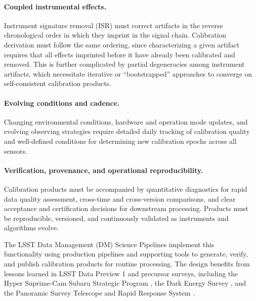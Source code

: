 \paragraph{Coupled instrumental effects.}
Instrument signature removal (ISR) must correct artifacts in the reverse chronological order in which they imprint in the signal chain.
Calibration derivation must follow the same ordering, since characterizing a given artifact requires that all effects imprinted before it have already been calibrated and removed.
This is further complicated by partial degeneracies among instrument artifacts, which necessitate iterative or ``bootstrapped'' approaches to converge on self-consistent calibration products.

\paragraph{Evolving conditions and cadence.}
Changing environmental conditions, hardware and operation mode updates, and evolving observing strategies require detailed daily tracking of calibration quality and well-defined conditions for determining new calibration epochs across all sensors.

\paragraph{Verification, provenance, and operational reproducibility.}
Calibration products must be accompanied by quantitative diagnostics for rapid data quality assessment, cross-time and cross-version comparisons, and clear acceptance and certification decisions for downstream processing.
Products must be reproducible, versioned, and continuously validated as instruments and algorithms evolve.

The LSST Data Management (DM) Science Pipelines \citep{PSTN-019,2017ASPC..512..279J,2018PASJ...70S...5B,2019ASPC..523..521B,2019ApJ...873..111I} implement this functionality using production pipelines and supporting tools to generate, verify, and publish calibration products for routine processing.
The design benefits from lessons learned in LSST Data Preview 1 \citep[DP1;][]{2026AJ....171..360V} and precursor surveys, including the Hyper Suprime-Cam Subaru Strategic Program \citep{2012SPIE.8446E..0ZM,2022PASJ...74..247A,2018PASJ...70S...5B}, the Dark Energy Survey \citep{2005astro.ph.10346T,2012PhPro..37.1332T,2018PASP..130g4501M}, and the Panoramic Survey Telescope and Rapid Response System \citep[Pan-STARRS;][]{2016arXiv161205560C,2020ApJS..251....3M,2020ApJS..251....4W}.

